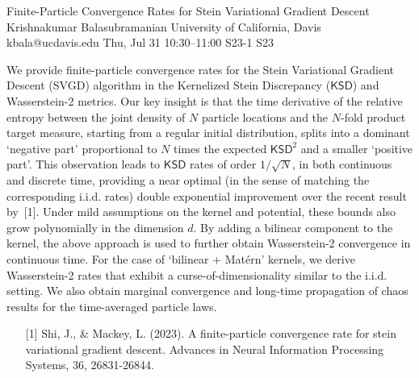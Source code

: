 \begin{talk}
  {Finite-Particle Convergence Rates for Stein Variational Gradient Descent}%
  {Krishnakumar Balasubramanian}%
  {University of California, Davis}%
  {kbala@ucdavis.edu}%
  {}%
  {}%
  {Thu, Jul 31 10:30–11:00}%
  {S23-1}%
  {S23}%
  {}%
  
				
			
 We provide finite-particle convergence rates for the Stein Variational Gradient Descent (SVGD) algorithm in the Kernelized Stein Discrepancy ($\mathsf{KSD}$) and Wasserstein-2 metrics. Our key insight is that the time derivative of the relative entropy between the joint density of $N$ particle locations and the $N$-fold product target measure, starting from a regular initial distribution, splits into a dominant `negative part' proportional to $N$ times the expected $\mathsf{KSD}^2$ and a smaller `positive part'. This observation leads to $\mathsf{KSD}$ rates of order $1/\sqrt{N}$, in both continuous and discrete time, providing a near optimal (in the sense of matching the corresponding i.i.d. rates) double exponential improvement over the recent result by~[1]. Under mild assumptions on the kernel and potential, these bounds also grow polynomially in the dimension $d$. By adding a bilinear component to the kernel, the above approach is used to further obtain Wasserstein-2 convergence in continuous time. For the case of `bilinear + Mat\'ern' kernels, we derive Wasserstein-2 rates that exhibit a curse-of-dimensionality similar to the i.i.d. setting. We also obtain marginal convergence and long-time propagation of chaos results for the time-averaged particle laws. 

\medskip


\begin{enumerate}
	\item[{[1]}] Shi, J., \& Mackey, L. (2023). A finite-particle convergence rate for stein variational gradient descent. Advances in Neural Information Processing Systems, 36, 26831-26844.
\end{enumerate}

\end{talk}

